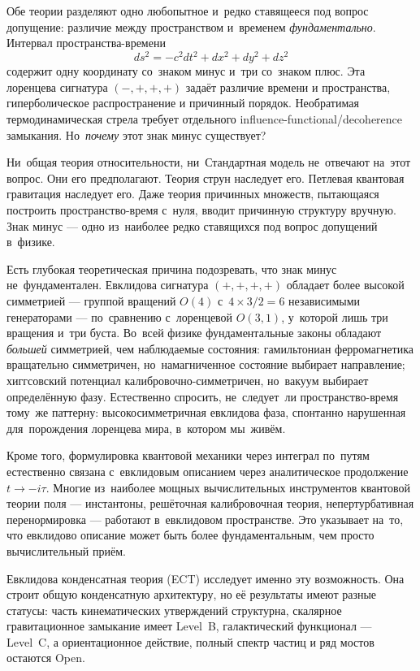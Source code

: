 \documentclass[11pt,a4paper]{article}
\begin{document}
Обе теории разделяют одно любопытное и~редко ставящееся под вопрос допущение: различие между пространством и~временем \emph{фундаментально}. Интервал пространства-времени
\begin{equation}
  ds^2 = -c^2 dt^2 + dx^2 + dy^2 + dz^2
  \label{eq:pop_interval}
\end{equation}
содержит одну координату со~знаком минус и~три со~знаком плюс. Эта лоренцева сигнатура $(-,+,+,+)$ задаёт различие времени и пространства, гиперболическое распространение и причинный порядок. Необратимая термодинамическая стрела требует отдельного influence-functional/decoherence замыкания. Но~\emph{почему} этот знак минус существует?

Ни~общая теория относительности, ни~Стандартная модель не~отвечают на~этот вопрос. Они его предполагают. Теория струн наследует его. Петлевая квантовая гравитация наследует его. Даже теория причинных множеств, пытающаяся построить пространство-время с~нуля, вводит причинную структуру вручную. Знак минус --- одно из~наиболее редко ставящихся под вопрос допущений в~физике.

Есть глубокая теоретическая причина подозревать, что знак минус не~фундаментален. Евклидова сигнатура $(+,+,+,+)$ обладает более высокой симметрией --- группой вращений $O(4)$ с~$4\times3/2=6$ независимыми генераторами --- по~сравнению с~лоренцевой $O(3,1)$, у~которой лишь три вращения и~три буста. Во~всей физике фундаментальные законы обладают \emph{большей} симметрией, чем наблюдаемые состояния: гамильтониан ферромагнетика вращательно симметричен, но~намагниченное состояние выбирает направление; хиггсовский потенциал калибровочно-симметричен, но~вакуум выбирает определённую фазу. Естественно спросить, не~следует~ли пространство-время тому~же паттерну: высокосимметричная евклидова фаза, спонтанно нарушенная для~порождения лоренцева мира, в~котором мы~живём.

Кроме того, формулировка квантовой механики через интеграл по~путям естественно связана с~евклидовым описанием через аналитическое продолжение $t \to -i\tau$. Многие из~наиболее мощных вычислительных инструментов квантовой теории поля --- инстантоны, решёточная калибровочная теория, непертурбативная перенормировка --- работают в~евклидовом пространстве. Это указывает на~то, что евклидово описание может быть более фундаментальным, чем просто вычислительный приём.

Евклидова конденсатная теория (ECT) исследует именно эту возможность. Она строит общую конденсатную архитектуру, но её результаты имеют разные статусы: часть кинематических утверждений структурна, скалярное гравитационное замыкание имеет Level~B, галактический функционал --- Level~C, а ориентационное действие, полный спектр частиц и ряд мостов остаются Open.
\end{document}
